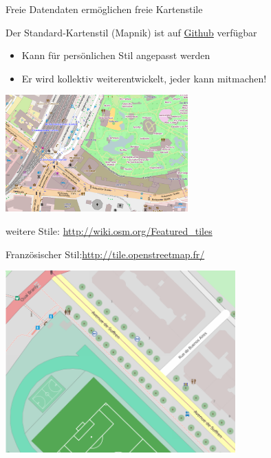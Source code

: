 \documentclass[handout]{beamer}
\begin{document}
\begin{frame}{Freie Datendaten ermöglichen freie Kartenstile}

Der Standard-Kartenstil (Mapnik) ist auf \href{https://github.com/gravitystorm/openstreetmap-carto/}{Github} verfügbar
\begin{itemize}
  \item Kann für persönlichen Stil angepasst werden
  \item Er wird kollektiv weiterentwickelt, jeder kann mitmachen!
\end{itemize}

\begin{center}
\includegraphics[width=7cm]{style-mapnik.png}
\end{center}

\vspace{-0.5cm}
weitere Stile: \url{http://wiki.osm.org/Featured\_tiles}

\end{frame}

\hypersetup{urlcolor=cyan}

\begin{frame}{Französischer Stil:\hfill\url{http://tile.openstreetmap.fr/}}
\begin{center}
\includegraphics[height=7cm]{style-french.png}
\end{center}
\end{frame}
\end{document}
